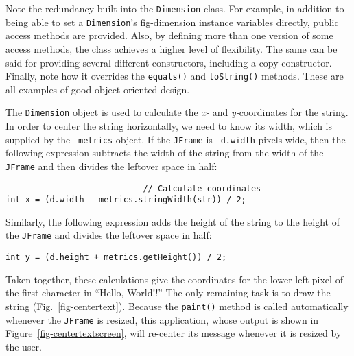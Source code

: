 \noindent Note the redundancy built into the {\tt Dimension} class.  
For example, in addition to being able to set a {\tt Dimension}'s
{fig-dimension}
instance variables directly, public access methods are provided.
Also, by defining more than one version of some access methods, the
class achieves a higher level of flexibility.  The same can be said
for providing several different constructors, including a copy
constructor.  Finally, note how it overrides the {\tt equals()} and
{\tt toString()} methods.  These are all examples of good
object-oriented design.


The {\tt Dimension} object is used to calculate the {\it x-} and {\it
y-}coordinates for the string. In order to center the string
horizontally, we need to know its width, which is supplied by the {\tt
metrics} object.  If the {\tt JFrame} is {\tt
d.width} pixels wide, then the following expression subtracts the
width of the string from the width of the {\tt JFrame} and then divides the
leftover space in half:

\begin{jjjlisting}
\begin{lstlisting}
                            // Calculate coordinates
int x = (d.width - metrics.stringWidth(str)) / 2; 
\end{lstlisting}
\end{jjjlisting}

\noindent Similarly, the following expression adds the height
of the string to the height of the {\tt JFrame} and divides the leftover
space in half:

\begin{jjjlisting}
\begin{lstlisting}
int y = (d.height + metrics.getHeight()) / 2;
\end{lstlisting}
\end{jjjlisting}

\noindent Taken together, these calculations give the coordinates for the
lower left pixel of the first character in ``Hello, World!!''  The only
remaining task is to draw the string (Fig.~\ref{fig-centertext}).
Because the {\tt paint()} method is called automatically whenever
the {\tt JFrame} is resized, this application, whose output is shown in
Figure~\ref{fig-centertextscreen}, will re-center its message whenever
it is resized by the user.

